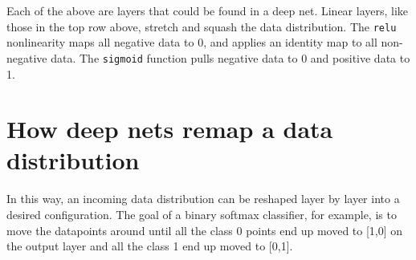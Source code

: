 Each of the above are layers that could be found in a deep net. Linear layers, like those in the top row above, stretch and squash the data distribution. The \texttt{relu} nonlinearity maps all negative data to 0, and applies an identity map to all non-negative data. The \texttt{sigmoid} function pulls negative data to 0 and positive data to 1.

\section{How deep nets remap a data distribution}
In this way, an incoming data distribution can be reshaped layer by layer into a desired configuration. The goal of a binary softmax classifier, for example, is to move the datapoints around until all the class 0 points end up moved to [1,0] on the output layer and all the class 1 end up moved to [0,1].

